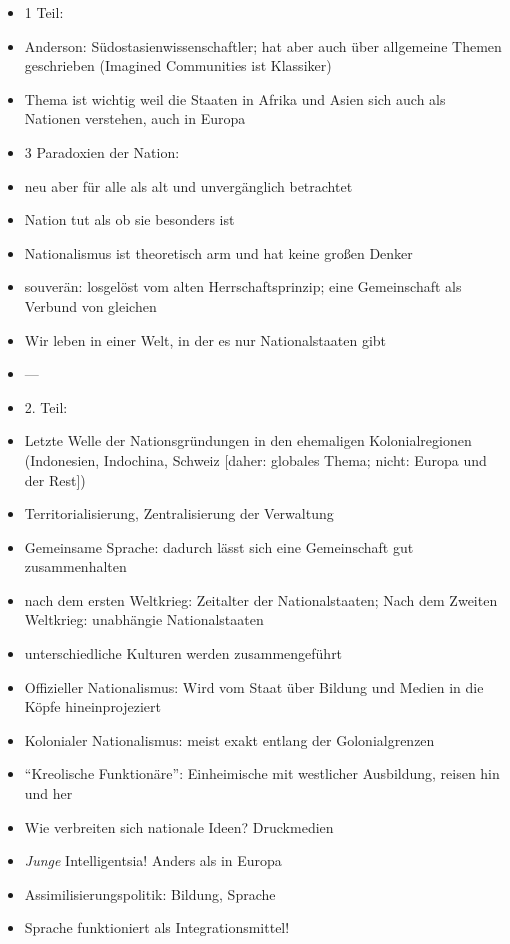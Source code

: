 \documentclass[emulatestandardclasses]{scrartcl}
\begin{document}
\begin{itemize}
  \item 1 Teil: 
  \item Anderson: Südostasienwissenschaftler; hat aber auch über allgemeine Themen geschrieben (Imagined Communities ist Klassiker)
  \item Thema ist wichtig weil die Staaten in Afrika und Asien sich auch als Nationen verstehen, auch in Europa 
  \item 3 Paradoxien der Nation: 
  \item neu aber für alle als alt und unvergänglich betrachtet
  \item Nation tut als ob sie besonders ist
  \item Nationalismus ist theoretisch arm und hat keine großen Denker
  \item souverän: losgelöst vom alten Herrschaftsprinzip; eine Gemeinschaft als Verbund von gleichen
  \item Wir leben in einer Welt, in der es nur Nationalstaaten gibt
  \item ---
  \item 2. Teil:
  \item Letzte Welle der Nationsgründungen in den ehemaligen Kolonialregionen (Indonesien, Indochina, Schweiz [daher: globales Thema; nicht: Europa und der Rest])
  \item Territorialisierung, Zentralisierung der Verwaltung
  \item Gemeinsame Sprache: dadurch lässt sich eine Gemeinschaft gut zusammenhalten
  \item nach dem ersten Weltkrieg: Zeitalter der Nationalstaaten; Nach dem Zweiten Weltkrieg: unabhängie Nationalstaaten
  \item unterschiedliche Kulturen werden zusammengeführt
  \item Offizieller Nationalismus: Wird vom Staat über Bildung und Medien in die Köpfe hineinprojeziert
  \item Kolonialer Nationalismus: meist exakt entlang der Golonialgrenzen
  \item "`Kreolische Funktionäre"': Einheimische mit westlicher Ausbildung, reisen hin und her
  \item Wie verbreiten sich nationale Ideen? Druckmedien
  \item \emph{Junge} Intelligentsia! Anders als in Europa
  \item Assimilisierungspolitik: Bildung, Sprache
  \item Sprache funktioniert als Integrationsmittel!
\end{itemize}
\end{document}
